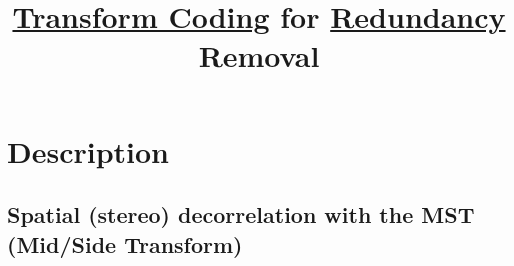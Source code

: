 
\title{\href{https://en.wikipedia.org/wiki/Transform_coding}{Transform Coding} for \href{https://en.wikipedia.org/wiki/Data_redundancy}{Redundancy} Removal}


\maketitle
\tableofcontents

\section{Description}

\subsection{Spatial (stereo) decorrelation with the MST (Mid/Side Transform)}

